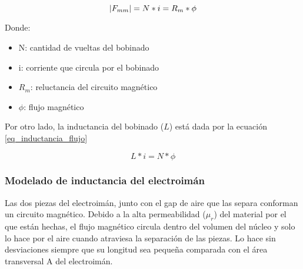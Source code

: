 



\begin{equation} \label{eq_fuerza-magnetomotriz}
	\lvert F_{mm}\rvert=N*i=R_{m}*\phi	
\end{equation}

\noindent Donde: 
\begin{itemize}
	\item N: cantidad de vueltas del bobinado
	\item i: corriente que circula por el bobinado
	\item $R_{m}$: reluctancia del circuito magnético
	\item $\phi$: flujo magnético
\end{itemize}


\noindent Por otro lado, la inductancia del bobinado ($L$) está dada por la ecuación \ref{eq_inductancia_flujo}

\begin{equation} \label{eq_inductancia_flujo}
	L*i=N*\phi
\end{equation}

\subsubsection{Modelado de inductancia del electroimán}

\noindent Las dos piezas del electroimán, junto con el gap de aire que las separa conforman un circuito magnético. Debido a la alta permeabilidad ($\mu_{r}$) del material por el que están hechas, el flujo magnético circula dentro del volumen del núcleo y solo lo hace por el aire cuando atraviesa la separación de las piezas. Lo hace sin desviaciones siempre que su longitud sea pequeña comparada con el área transversal A del electroimán.

